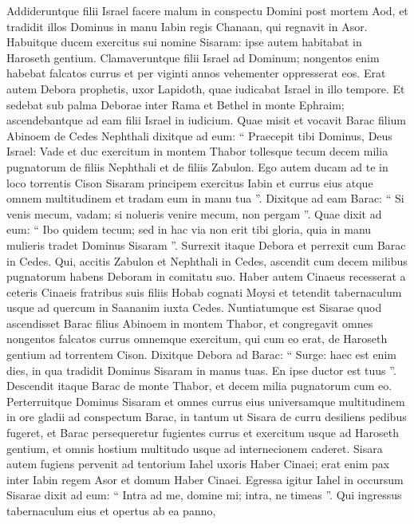 \begin{biblechapter}
\begin{biblechapter}
\begin{biblechapter}
\begin{biblechapter}
\verse Addideruntque filii Israel facere malum in conspectu Domini post mortem Aod, 
\verse et tradidit illos Dominus in manu Iabin regis Chanaan, qui regnavit in Asor. Habuitque ducem exercitus sui nomine Sisaram: ipse autem habitabat in Haroseth gentium. 
\verse Clamaveruntque filii Israel ad Dominum; nongentos enim habebat falcatos currus et per viginti annos vehementer oppresserat eos.
 \verse Erat autem Debora prophetis, uxor Lapidoth, quae iudicabat Israel in illo tempore. 
\verse Et sedebat sub palma Deborae inter Rama et Bethel in monte Ephraim; ascendebantque ad eam filii Israel in iudicium. 
\verse Quae misit et vocavit Barac filium Abinoem de Cedes Nephthali dixitque ad eum: “ Praecepit tibi Dominus, Deus Israel: Vade et duc exercitum in montem Thabor tollesque tecum decem milia pugnatorum de filiis Nephthali et de filiis Zabulon. 
\verse Ego autem ducam ad te in loco torrentis Cison Sisaram principem exercitus Iabin et currus eius atque omnem multitudinem et tradam eum in manu tua ”. 
\verse Dixitque ad eam Barac: “ Si venis mecum, vadam; si nolueris venire mecum, non pergam ”. 
 \verse Quae dixit ad eum: “ Ibo quidem tecum; sed in hac via non erit tibi gloria, quia in manu mulieris tradet Dominus Sisaram ”.
 Surrexit itaque Debora et perrexit cum Barac in Cedes. 
\verse Qui, accitis Zabulon et Nephthali in Cedes, ascendit cum decem milibus pugnatorum habens Deboram in comitatu suo. 
\verse Haber autem Cinaeus recesserat a ceteris Cinaeis fratribus suis filiis Hobab cognati Moysi et tetendit tabernaculum usque ad quercum in Saananim iuxta Cedes.
 \verse Nuntiatumque est Sisarae quod ascendisset Barac filius Abinoem in montem Thabor, 
\verse et congregavit omnes nongentos falcatos currus omnemque exercitum, qui cum eo erat, de Haroseth gentium ad torrentem Cison.
 \verse Dixitque Debora ad Barac: “ Surge: haec est enim dies, in qua tradidit Dominus Sisaram in manus tuas. En ipse ductor est tuus ”. Descendit itaque Barac de monte Thabor, et decem milia pugnatorum cum eo. 
\verse Perterruitque Dominus Sisaram et omnes currus eius universamque multitudinem in ore gladii ad conspectum Barac, in tantum ut Sisara de curru desiliens pedibus fugeret, 
\verse et Barac persequeretur fugientes currus et exercitum usque ad Haroseth gentium, et omnis hostium multitudo usque ad internecionem caderet.
 \verse Sisara autem fugiens pervenit ad tentorium Iahel uxoris Haber Cinaei; erat enim pax inter Iabin regem Asor et domum Haber Cinaei. 
\verse Egressa igitur Iahel in occursum Sisarae dixit ad eum: “ Intra ad me, domine mi; intra, ne timeas ”. Qui ingressus tabernaculum eius et opertus ab ea panno, 

\end{biblechapter}
\end{biblechapter}
\end{biblechapter}
\end{biblechapter}
